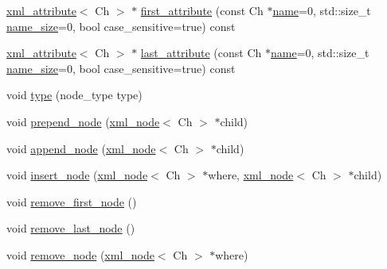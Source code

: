 \begin{DoxyCompactItemize}
\item 
\hyperlink{singletonrapidxml_1_1xml__attribute}{xml\+\_\+attribute}$<$ Ch $>$ $\ast$ \hyperlink{singletonrapidxml_1_1xml__node_ae426802be58114ffc41bf30ac6b8c37d}{first\+\_\+attribute} (const Ch $\ast$\hyperlink{classrapidxml_1_1xml__base_a9a09739310469995db078ebd0da3ed45}{name}=0, std\+::size\+\_\+t \hyperlink{classrapidxml_1_1xml__base_a7e7f98b3d01e1eab8dc1ca69aad9af84}{name\+\_\+size}=0, bool case\+\_\+sensitive=true) const 
\item 
\hyperlink{singletonrapidxml_1_1xml__attribute}{xml\+\_\+attribute}$<$ Ch $>$ $\ast$ \hyperlink{singletonrapidxml_1_1xml__node_a50c03f2db3fa51f27a73d86ec29a49d3}{last\+\_\+attribute} (const Ch $\ast$\hyperlink{classrapidxml_1_1xml__base_a9a09739310469995db078ebd0da3ed45}{name}=0, std\+::size\+\_\+t \hyperlink{classrapidxml_1_1xml__base_a7e7f98b3d01e1eab8dc1ca69aad9af84}{name\+\_\+size}=0, bool case\+\_\+sensitive=true) const 
\item 
void \hyperlink{singletonrapidxml_1_1xml__node_a499bbc9300c1b06821d5c08b24164c68}{type} (node\+\_\+type type)
\item 
void \hyperlink{singletonrapidxml_1_1xml__node_ae86e92908c3eab40bbed8216e4f3f3cb}{prepend\+\_\+node} (\hyperlink{singletonrapidxml_1_1xml__node}{xml\+\_\+node}$<$ Ch $>$ $\ast$child)
\item 
void \hyperlink{singletonrapidxml_1_1xml__node_a8696d098ecc9c4d2a646b43e91d58e31}{append\+\_\+node} (\hyperlink{singletonrapidxml_1_1xml__node}{xml\+\_\+node}$<$ Ch $>$ $\ast$child)
\item 
void \hyperlink{singletonrapidxml_1_1xml__node_a666880f42a7e486d78cc45ed51c7c46d}{insert\+\_\+node} (\hyperlink{singletonrapidxml_1_1xml__node}{xml\+\_\+node}$<$ Ch $>$ $\ast$where, \hyperlink{singletonrapidxml_1_1xml__node}{xml\+\_\+node}$<$ Ch $>$ $\ast$child)
\item 
void \hyperlink{singletonrapidxml_1_1xml__node_a62bf7b276cf7a651a3337f5e0a0ef6ac}{remove\+\_\+first\+\_\+node} ()
\item 
void \hyperlink{singletonrapidxml_1_1xml__node_a9182512e948ec451a83f116cce7c7674}{remove\+\_\+last\+\_\+node} ()
\item 
\hypertarget{singletonrapidxml_1_1xml__node_a98289923eb9e8889418a9eb0207ea35c}{void \hyperlink{singletonrapidxml_1_1xml__node_a98289923eb9e8889418a9eb0207ea35c}{remove\+\_\+node} (\hyperlink{singletonrapidxml_1_1xml__node}{xml\+\_\+node}$<$ Ch $>$ $\ast$where)}\label{singletonrapidxml_1_1xml__node_a98289923eb9e8889418a9eb0207ea35c}


\end{DoxyCompactItemize}
